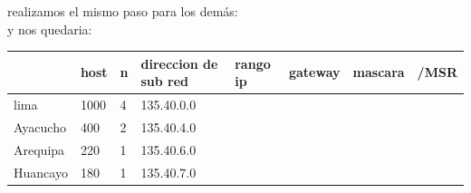 realizamos el mismo paso para los dem\'as:\\
y nos quedaria:
\begin{table}[htbp]
\begin{tabular}{@{}llllllll@{}}
\toprule
\rowcolor[HTML]{32CB00} 
\multicolumn{1}{|l|}{\cellcolor[HTML]{32CB00}\textbf{subred}} & \multicolumn{1}{l|}{\cellcolor[HTML]{32CB00}\textbf{host}} & \multicolumn{1}{l|}{\cellcolor[HTML]{32CB00}\textbf{n}} & \multicolumn{1}{l|}{\cellcolor[HTML]{32CB00}\textbf{direccion de sub red}} & \multicolumn{1}{l|}{\cellcolor[HTML]{32CB00}\textbf{rango ip}} & \multicolumn{1}{l|}{\cellcolor[HTML]{32CB00}\textbf{gateway}} & \multicolumn{1}{l|}{\cellcolor[HTML]{32CB00}\textbf{mascara}} & \multicolumn{1}{l|}{\cellcolor[HTML]{32CB00}\textbf{/MSR}} \\ \midrule
\multicolumn{1}{|l|}{lima}                                    & \multicolumn{1}{l|}{1000}                                  & \multicolumn{1}{l|}{4}                                  & \multicolumn{1}{l|}{135.40.0.0}                                            & \multicolumn{1}{l|}{}                                          & \multicolumn{1}{l|}{}                                         & \multicolumn{1}{l|}{}                                         & \multicolumn{1}{l|}{}                                      \\ \midrule
\multicolumn{1}{|l|}{Ayacucho}                                & \multicolumn{1}{l|}{400}                                   & \multicolumn{1}{l|}{2}                                  & \multicolumn{1}{l|}{135.40.4.0}                                            & \multicolumn{1}{l|}{}                                          & \multicolumn{1}{l|}{}                                         & \multicolumn{1}{l|}{}                                         & \multicolumn{1}{l|}{}                                      \\ \midrule
\multicolumn{1}{|l|}{Arequipa}                                & \multicolumn{1}{l|}{220}                                   & \multicolumn{1}{l|}{1}                                  & \multicolumn{1}{l|}{135.40.6.0}                                            & \multicolumn{1}{l|}{}                                          & \multicolumn{1}{l|}{}                                         & \multicolumn{1}{l|}{}                                         & \multicolumn{1}{l|}{}                                      \\ \midrule
\multicolumn{1}{|l|}{Huancayo}                                & \multicolumn{1}{l|}{180}                                   & \multicolumn{1}{l|}{1}                                  & \multicolumn{1}{l|}{135.40.7.0}                                            & \multicolumn{1}{l|}{}                                          & \multicolumn{1}{l|}{}                                         & \multicolumn{1}{l|}{}                                         & \multicolumn{1}{l|}{}                                      \\ \midrule

\end{tabular}
\end{table}
